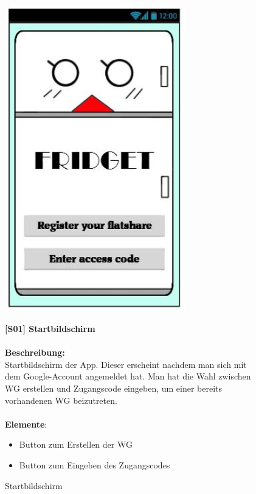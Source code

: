 \documentclass[a4paper]{scrreprt}
\begin{document}
        \begin{figure}[h]
        	\begin{minipage}[b]{0.4\linewidth}
        		
        		\flushright
        		\centering
        		\includegraphics[width=0.7\textwidth]{fridget_start.JPG}
        		\caption{Startbildschirm}
        		\label{fig:figure1}
        	\end{minipage}
        	\hspace{0.5cm}
        	\begin{minipage}[b]{0.55\linewidth}
        		\flushleft
        		\textbf{{[}S01{]} Startbildschirm} \\
        		\hfill
        		\\\textbf{Beschreibung:} \\
        		Startbildschirm der App. Dieser erscheint nachdem man sich mit dem Google-Account angemeldet hat. Man hat die Wahl zwischen WG erstellen und Zugangscode eingeben, um einer bereits vorhandenen WG beizutreten.
        		\\
        		\hfill 
        		\\\textbf{Elemente}:
        		\begin{itemize}
        		\renewcommand\labelitemi{--}
        		\item Button zum Erstellen der WG
        		\item Button zum Eingeben des Zugangscodes
        		\end{itemize}
        	

\end{minipage}
\end{figure}
\end{document}
